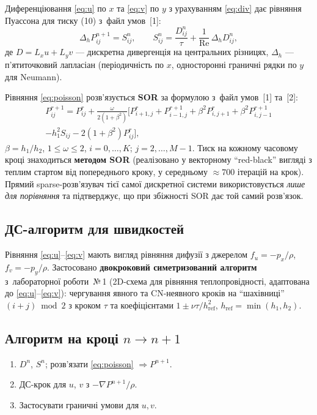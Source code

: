 \documentclass[14pt,a4paper,extarticle]{extarticle}
\newcommand{\Rey}{\mathrm{Re}}
\newcommand{\lrcond}{файл умов~[1]}
\newcommand{\lrone}{лабораторної роботи~№\,1}
\begin{document}
Диференціювання \eqref{eq:u} по $x$ та \eqref{eq:v} по $y$ з урахуванням
\eqref{eq:div} дає рівняння Пуассона для тиску (10) з~\lrcond{}:
\begin{equation}
  \Delta_h P_{ij}^{n+1} = S_{ij}^{n}, \qquad
  S_{ij}^{n} = \frac{D_{ij}^{n}}{\tau} + \frac{1}{\Rey}\,\Delta_h D_{ij}^{n},
  \label{eq:poisson}
\end{equation}
де $D=L_x u + L_y v$ --- дискретна дивергенція на центральних різницях,
$\Delta_h$ --- п'ятиточковий лапласіан (періодичність по $x$, односторонні
граничні рядки по $y$ для Neumann).

Рівняння \eqref{eq:poisson} розв'язується \textbf{SOR} за формулою з~\lrcond{}
та~[2]:
\begin{multline}
  P_{ij}^{r+1} = P_{ij}^{r} + \frac{\omega}{2(1+\beta^2)}\Big[
    P_{i+1,j}^{r} + P_{i-1,j}^{r+1} + \beta^2 P_{i,j+1}^{r} + \beta^2 P_{i,j-1}^{r+1}\\
    - h_1^2 S_{ij} - 2(1+\beta^2)P_{ij}^{r}\Big],
\end{multline}
$\beta=h_1/h_2$, $1\le\omega\le2$, $i=0,\ldots,K$; $j=2,\ldots,M-1$.
Тиск на кожному часовому кроці знаходиться \textbf{методом SOR} (реалізовано у
векторному ``red-black'' вигляді з теплим стартом від попереднього кроку, у
середньому $\approx700$ ітерацій на крок). Прямий sparse-розв'язувач тієї самої
дискретної системи використовується \emph{лише для порівняння} та підтверджує,
що при збіжності SOR дає той самий розв'язок.

\subsection{ДС-алгоритм для швидкостей}

Рівняння \eqref{eq:u}--\eqref{eq:v} мають вигляд рівняння дифузії з джерелом
$f_u=-p_x/\rho$, $f_v=-p_y/\rho$. Застосовано \textbf{двокроковий симетризований
алгоритм} з~\lrone{} (2D-схема для рівняння теплопровідності, адаптована
до \eqref{eq:u}--\eqref{eq:v}): чергування явного та CN-неявного кроків на
``шахівниці'' $(i+j)\bmod2$ з кроком $\tau$ та коефіцієнтами
$1\pm\nu\tau/h_{\mathrm{ref}}^2$, $h_{\mathrm{ref}}=\min(h_1,h_2)$.

\subsection{Алгоритм на кроці $n\to n+1$}
\begin{enumerate}
  \item $D^n$, $S^n$; розв'язати \eqref{eq:poisson} $\Rightarrow P^{n+1}$.
  \item ДС-крок для $u$, $v$ з $-\nabla P^{n+1}/\rho$.
  \item Застосувати граничні умови для $u,v$.
\end{enumerate}
\end{document}
